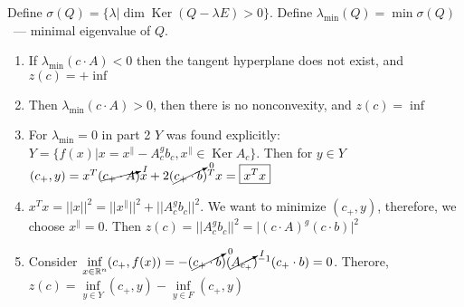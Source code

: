 \documentclass[a4paper]{article}
\DeclareMathOperator{\Ker}{Ker}
\begin{document}
Define $\sigma(Q)=\{\lambda\big |\dim\Ker (Q-\lambda E)>0\}$. Define $\lambda_{\min}(Q)=\min\sigma(Q)$~--- minimal eigenvalue of $Q$.

\begin{enumerate}
\item If $\lambda_{\min}(c\cdot A)<0$ then the tangent hyperplane does not exist, and $z(c)=+\inf$
\item Then $\lambda_{\min}(c\cdot A)>0$, then there is no nonconvexity, and $z(c)=\inf$
\item For $\lambda_{\min}=0$ in part 2 $Y$ was found explicitly: $Y=\{f(x)\big|x=x^\parallel-A_c^gb_c, x^\parallel \in\Ker A_c\}$. Then for $y\in Y$ $(c_+,y)=x^T(\cancelto{I}{c_+\cdot A})x+2(\cancelto{0}{c_+\cdot b})^Tx=\boxed{x^Tx}$
\item $x^Tx=||x||^2=||x^\parallel||^2+||A_c^gb_c||^2$. We want to minimize $(c_+,y)$, therefore, we choose $x^\parallel=0$. Then $z(c)=||A_c^gb_c||^2=\boxed{\big|(c \cdot A)^g(c\cdot b) \big|^2}$
\item Consider $\inf\limits_{x\in\mathbb{R}^n} (c_+,f(x))=-(\cancelto{0}{c_+\cdot b})(\cancelto{I}{A_{c_+}})^{-1}(c_+\cdot b)=0$. Therore, $z(c)=\inf\limits_{y\in Y}(c_+,y)-\inf\limits_{y\in F}(c_+,y)$
\end{enumerate}
\end{document}
